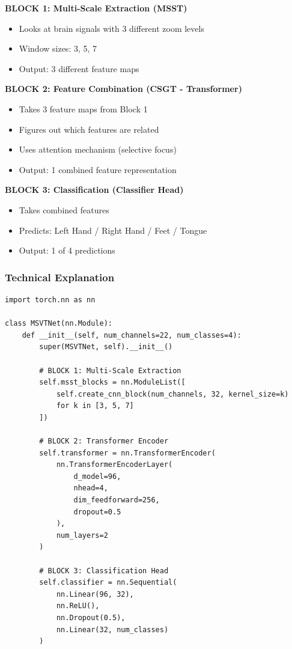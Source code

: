 \documentclass[12pt,a4paper]{article}
\begin{document}
\begin{tcolorbox}[colback=magenta!10,colframe=magenta!50!black,title=Model Structure]

\textbf{BLOCK 1: Multi-Scale Extraction (MSST)}
\begin{itemize}
    \item Looks at brain signals with 3 different zoom levels
    \item Window sizes: 3, 5, 7
    \item Output: 3 different feature maps
\end{itemize}

\textbf{BLOCK 2: Feature Combination (CSGT - Transformer)}
\begin{itemize}
    \item Takes 3 feature maps from Block 1
    \item Figures out which features are related
    \item Uses attention mechanism (selective focus)
    \item Output: 1 combined feature representation
\end{itemize}

\textbf{BLOCK 3: Classification (Classifier Head)}
\begin{itemize}
    \item Takes combined features
    \item Predicts: Left Hand / Right Hand / Feet / Tongue
    \item Output: 1 of 4 predictions
\end{itemize}

\end{tcolorbox}

\subsubsection{Technical Explanation}

\begin{lstlisting}[caption={Model Architecture}]
import torch.nn as nn

class MSVTNet(nn.Module):
    def __init__(self, num_channels=22, num_classes=4):
        super(MSVTNet, self).__init__()
        
        # BLOCK 1: Multi-Scale Extraction
        self.msst_blocks = nn.ModuleList([
            self.create_cnn_block(num_channels, 32, kernel_size=k)
            for k in [3, 5, 7]
        ])
        
        # BLOCK 2: Transformer Encoder
        self.transformer = nn.TransformerEncoder(
            nn.TransformerEncoderLayer(
                d_model=96,
                nhead=4,
                dim_feedforward=256,
                dropout=0.5
            ),
            num_layers=2
        )
        
        # BLOCK 3: Classification Head
        self.classifier = nn.Sequential(
            nn.Linear(96, 32),
            nn.ReLU(),
            nn.Dropout(0.5),
            nn.Linear(32, num_classes)
        )
\end{lstlisting}
\end{document}
